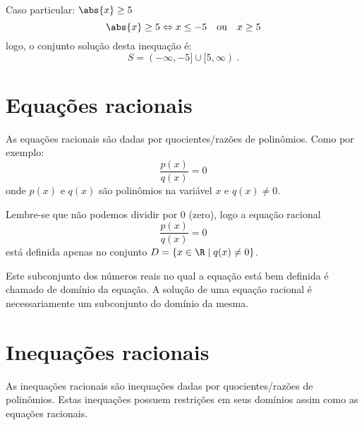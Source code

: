 \begin{exem}
   Caso particular: $\abs{x} \geq 5$
\begin{equation}
\abs{x} \geq 5 \Leftrightarrow x \leq -5 \ \ \text{ ou } \ \ x \geq 5
\end{equation}
   logo, o conjunto solução desta inequação é:
\begin{equation}
S= (-\infty, -5] \cup [5, \infty) \ . 
\end{equation}
 \end{exem}
 
 \section{Equações racionais}
 \vskip0.3cm
 \colorbox{azul}{
 \begin{minipage}{0.9\linewidth}
 \begin{center}
  As equações racionais são dadas por quocientes/razões de polinômios. Como por exemplo:
  \[\dfrac{p(x)}{q(x)}= 0\]
  onde $p(x)$ e $q(x)$ são polinômios na variável $x$ e $q(x) \neq 0$.
 \end{center}
 \end{minipage}}
 \vskip0.3cm
 
 Lembre-se que não podemos dividir por $0$ (zero), logo a equação racional
 \[\dfrac{p(x)}{q(x)}= 0\]
 está definida apenas no conjunto $D= \{x \in \R \mid q(x) \neq 0\}$.
 
 Este subconjunto dos números reais no qual a equação está bem definida é chamado de domínio da equação. A solução de uma equação racional é necessariamente um subconjunto do domínio da mesma.
 
 \section{Inequações racionais}

 \vskip0.3cm
 \colorbox{azul}{
 \begin{minipage}{0.9\linewidth}
 \begin{center}
  As inequações racionais são inequações dadas por quocientes/razões de polinômios. Estas inequações possuem restrições em seus domínios assim como as equações racionais.
 \end{center}
 \end{minipage}}
 \vskip0.3cm
 
